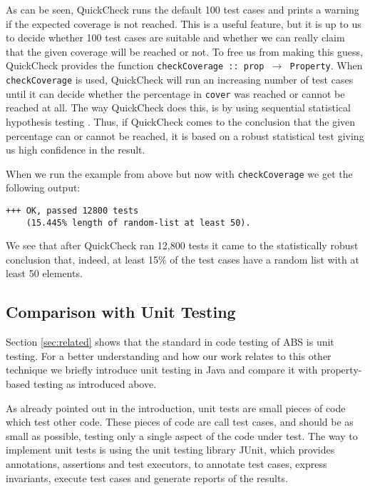 As can be seen, QuickCheck runs the default 100 test cases and prints a warning if the expected coverage is not reached. This is a useful feature, but it is up to us to decide whether 100 test cases are suitable and whether we can really claim that the given coverage will be reached or not. To free us from making this guess, QuickCheck provides the function \texttt{checkCoverage :: prop $\rightarrow$ Property}. When \texttt{checkCoverage} is used, QuickCheck will run an increasing number of test cases until it can decide whether the percentage in \texttt{cover} was reached or cannot be reached at all. The way QuickCheck does this, is by using sequential statistical hypothesis testing \cite{wald_sequential_1992}. Thus, if QuickCheck comes to the conclusion that the given percentage can or cannot be reached, it is based on a robust statistical test giving us high confidence in the result.

When we run the example from above but now with \texttt{checkCoverage} we get the following output:

\begin{footnotesize}
\begin{verbatim}
+++ OK, passed 12800 tests 
    (15.445% length of random-list at least 50).
\end{verbatim}
\end{footnotesize}

We see that after QuickCheck ran 12,800 tests it came to the statistically robust conclusion that, indeed, at least 15\% of the test cases have a random list with at least 50 elements. 

\subsection{Comparison with Unit Testing}
Section \ref{sec:related} shows that the standard in code testing of ABS is unit testing. For a better understanding and how our work relates to this other technique we briefly introduce unit testing in Java and compare it with property-based testing as introduced above.

As already pointed out in the introduction, unit tests are small pieces of code which test other code. These pieces of code are call test cases, and should be as small as possible, testing only a single aspect of the code under test. The way to implement unit tests is using the unit testing library JUnit, which provides annotations, assertions and test executors, to annotate test cases, express invariants, execute test cases and generate reports of the results. 

